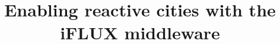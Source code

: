 \documentclass[a4paper, 11pt]{article} %
\begin{document}
\title{Enabling reactive cities with the iFLUX middleware}

%
%
%
%
%




\end{document}
